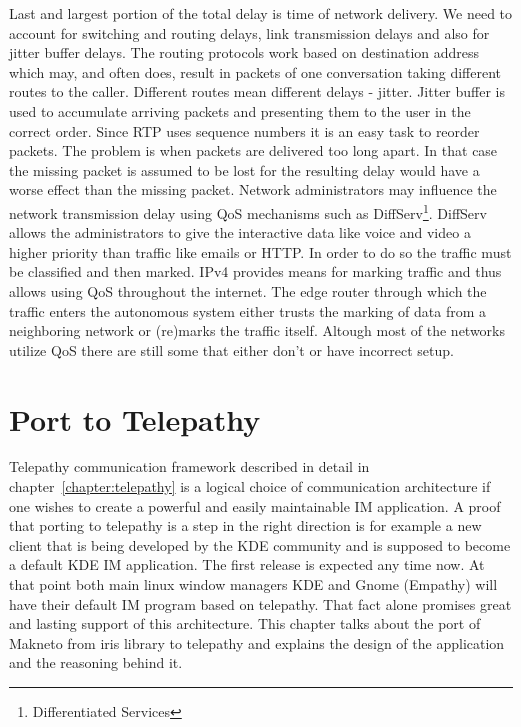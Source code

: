 Last and largest portion of the total delay is time of network delivery. We need to account for switching and routing delays, link transmission delays and also for jitter buffer delays. The routing protocols work based on destination address which may, and often does, result in packets of one conversation taking different routes to the caller. Different routes mean different delays - jitter. Jitter buffer is used to accumulate arriving packets and presenting them to the user in the correct order. Since RTP uses sequence numbers it is an easy task to reorder packets. The problem is when packets are delivered too long apart. In that case the missing packet is assumed to be lost for the resulting delay would have a worse effect than the missing packet. Network administrators may influence the network transmission delay using QoS mechanisms such as DiffServ\footnote{Differentiated Services}. DiffServ allows the administrators to give the interactive data like voice and video a higher priority than traffic like emails or HTTP. In order to do so the traffic must be classified and then marked. IPv4 provides means for marking traffic and thus allows using QoS throughout the internet. The edge router through which the traffic enters the autonomous system either trusts the marking of data from a neighboring network or (re)marks the traffic itself. Altough most of the networks utilize QoS there are still some that either don't or have incorrect setup.  



\chapter{Port to Telepathy}\label{chapte:port-to-telepathy}
Telepathy communication framework described in detail in chapter~\ref{chapter:telepathy} is a logical choice of communication architecture if one wishes to create a powerful and easily maintainable IM application. A proof that porting to telepathy is a step in the right direction is for example a new client that is being developed by the KDE community and is supposed to become a default KDE IM application. The first release is expected any time now. At that point both main linux window managers KDE and Gnome (Empathy) will have their default IM program based on telepathy. That fact alone promises great and lasting support of this architecture. This chapter talks about the port of Makneto from iris library to telepathy and explains the design of the application and the reasoning behind it.

